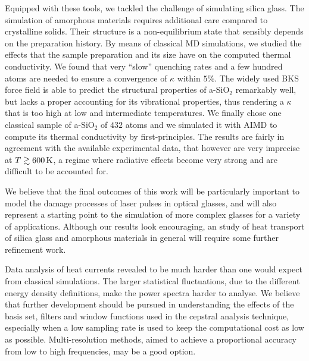 Equipped with these tools, we tackled the challenge of simulating silica glass. 
The simulation of amorphous materials requires additional care compared to crystalline solids. Their structure is a non-equilibrium state that sensibly depends on the preparation history. 
By means of classical MD simulations, we studied the effects that the sample preparation and its size have on the computed thermal conductivity. We found that very ``slow'' quenching rates and a few hundred atoms are needed to ensure a convergence of $\kappa$ within $5\%$. 
The widely used BKS force field is able to predict the structural properties of a-SiO$_2$ remarkably well, but lacks a proper accounting for its vibrational properties, thus rendering a $\kappa$ that is too high at low and intermediate temperatures. 
We finally chose one classical sample of a-SiO$_2$ of $432$ atoms and we simulated it with AIMD to compute its thermal conductivity by first-principles. 
The results are fairly in agreement with the available experimental data, that however are very imprecise at $T \gtrsim 600\,\mathrm{K}$, a regime where radiative effects become very strong and are difficult to be accounted for. 

\medskip
We believe that the final outcomes of this work will be particularly important to model the damage processes of laser pulses in optical glasses, and will also represent a starting point to the simulation of more complex glasses for a variety of applications. 
Although our results look encouraging, an \abinitio study of heat transport of silica glass and amorphous materials in general will require some further refinement work. 

Data analysis of \abinitio heat currents revealed to be much harder than one would expect from classical simulations. The larger statistical fluctuations, due to the different energy density definitions, make the power spectra harder to analyse. 
We believe that further development should be pursued in understanding the effects of the basis set, filters and window functions used in the cepstral analysis technique, especially when a low sampling rate is used to keep the computational cost as low as possible. 
Multi-resolution methods, aimed to achieve a proportional accuracy from low to high frequencies, may be a good option. 

